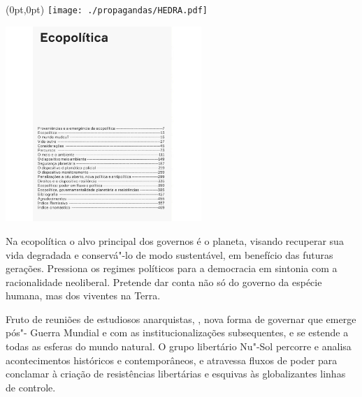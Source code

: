 \pagestyle{hedra}
\label{hedra}

\begin{textblock*}{5.625in}(0pt,0pt)%
\vspace*{-3.5cm}
\hspace*{-2.77cm}\texttt{[image: ./propagandas/HEDRA.pdf]}
\end{textblock*}

\pagebreak


\begin{center}
\hspace*{-3.6cm}
\hspace*{3.1cm}\includegraphics[width=74mm]{./grid/passetti.jpeg}
\end{center}

\hspace*{-7cm}\hrulefill\hspace*{-7cm}

\medskip

\noindent{}Na ecopolítica o alvo principal dos governos é o planeta, visando recuperar sua vida degradada e conservá"-lo de modo sustentável, em benefício das futuras gerações. Pressiona os regimes políticos para a democracia em sintonia com a racionalidade neoliberal. Pretende dar conta não só do governo da espécie humana, mas dos viventes na Terra.

Fruto de reuniões de estudiosos anarquistas, , nova forma de governar que emerge pós"- Guerra Mundial e com as institucionalizações subsequentes, e se estende a todas as esferas do mundo natural. O grupo libertário Nu"-Sol percorre e analisa acontecimentos históricos e contemporâneos, e atravessa fluxos de poder para conclamar à criação de resistências libertárias e esquivas às globalizantes linhas de controle.

